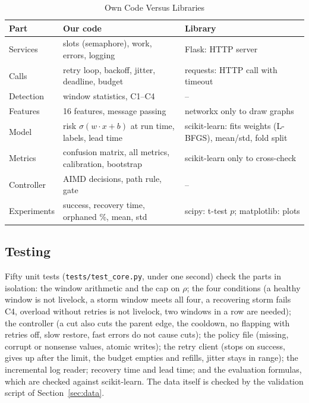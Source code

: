 \documentclass[conference,a4paper]{IEEEtran}
\begin{document}
\begin{table}[!t]
\caption{Own Code Versus Libraries}
\label{tab:libs}
\centering
\small
\setlength{\tabcolsep}{4pt}
\begin{tabular}{|L{1.55cm}|L{3.15cm}|L{2.6cm}|}
\hline
\textbf{Part} & \textbf{Our code} & \textbf{Library} \\ \hline
Services & slots (semaphore), work, errors, logging & Flask: HTTP server \\ \hline
Calls & retry loop, backoff, jitter, deadline, budget & requests: HTTP call with timeout \\ \hline
Detection & window statistics, C1--C4 & -- \\ \hline
Features & 16 features, message passing & networkx only to draw graphs \\ \hline
Model & risk $\sigma(w \cdot x + b)$ at run time, labels, lead time & scikit-learn: fits weights (L-BFGS), mean/std, fold split \\ \hline
Metrics & confusion matrix, all metrics, calibration, bootstrap & scikit-learn only to cross-check \\ \hline
Controller & AIMD decisions, path rule, gate & -- \\ \hline
Experiments & success, recovery time, orphaned \%, mean, std & scipy: t-test $p$; matplotlib: plots \\ \hline
\end{tabular}
\end{table}

\subsection{Testing}
Fifty unit tests (\texttt{tests/test\_core.py}, under one second) check the parts in isolation: the window arithmetic and the cap on $\rho$; the four conditions (a healthy window is not livelock, a storm window meets all four, a recovering storm fails C4, overload without retries is not livelock, two windows in a row are needed); the controller (a cut also cuts the parent edge, the cooldown, no flapping with retries off, slow restore, fast errors do not cause cuts); the policy file (missing, corrupt or nonsense values, atomic writes); the retry client (stops on success, gives up after the limit, the budget empties and refills, jitter stays in range); the incremental log reader; recovery time and lead time; and the evaluation formulas, which are checked against scikit-learn. The data itself is checked by the validation script of Section~\ref{sec:data}.
\end{document}
